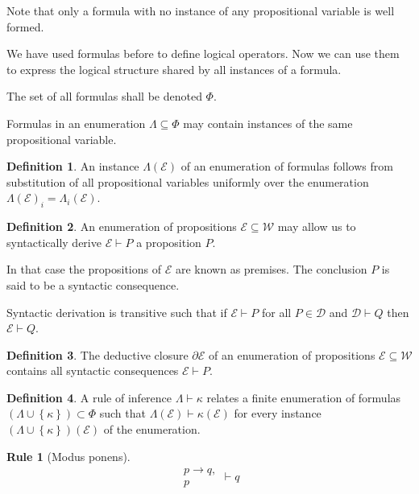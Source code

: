 \documentclass{amsbook}
\newcommand{\setsm}[1]{\left\{#1\right\}}
\newcommand{\wffs}{\mathcal W}
\newcommand{\infers}{\mathrel\vdash}
\theoremstyle{definition}
\newtheorem{frule}{Rule}[section]
\newtheorem{dfn}{Definition}[section]
\begin{document}
Note that only a formula with no instance of any propositional variable is well formed.

We have used formulas before to define logical operators.
Now we can use them to express the logical structure shared by all instances of a formula.

The set of all formulas shall be denoted $\Phi$.

Formulas in an enumeration $\Lambda \subseteq \Phi$ may contain instances of the same propositional variable.
\begin{dfn}
    An instance $\Lambda(\mathcal E)$ of an enumeration of formulas follows from substitution of all propositional variables uniformly over the enumeration $\Lambda(\mathcal E)_i = \Lambda_i(\mathcal E)$.
\end{dfn}

\begin{dfn}
    An enumeration of propositions $\mathcal E \subseteq \wffs$ may allow us to syntactically derive $\mathcal E \infers P$ a proposition $P$.

    In that case the propositions of $\mathcal E$ are known as premises. The conclusion $P$ is said to be a syntactic consequence.
\end{dfn}


Syntactic derivation is transitive such that if $\mathcal E \infers P$ for all $P \in \mathcal D$ and $\mathcal D \infers Q$ then $\mathcal E \infers Q$.

\begin{dfn}
    The deductive closure $\partial \mathcal E$ of an enumeration of propositions $\mathcal E \subseteq \wffs$ contains all syntactic consequences $\mathcal E \infers P$.
\end{dfn}

\begin{dfn}
    A rule of inference $\Lambda \infers \kappa$ relates a finite enumeration of formulas $(\Lambda \cup \setsm \kappa) \subset \Phi$ such that $\Lambda(\mathcal E) \infers \kappa(\mathcal E)$ for every instance $(\Lambda \cup \setsm \kappa)(\mathcal E)$ of the enumeration.
\end{dfn}

\begin{frule}[Modus ponens]
    $$\begin{aligned}p \rightarrow q, \\ p\end{aligned} \infers q$$
\end{frule}
\end{document}
